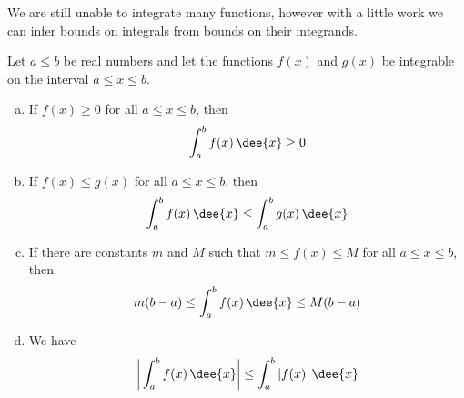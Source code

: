 We are still unable to integrate many functions, however with a little work we
can infer bounds on integrals from bounds on their integrands.
\begin{theorem}\label{thm:INTineq}
Let $a\le b$  be real numbers and let the functions $f(x)$ and $g(x)$
be integrable on the interval $a\le x\le b$.
\begin{enumerate}[(a)]
\item If $f(x)\ge 0$ for all $a\le x\le b$, then
\begin{align*}
\int_a^b f(x)\,\dee{x} \ge 0
\end{align*}
\item If $f(x)\le g(x)$ for all $a\le x\le b$, then
\begin{align*}
\int_a^b f(x)\,\dee{x} \le \int_a^b g(x)\,\dee{x}
\end{align*}
\item If there are constants $m$ and $M$ such that  $m\le f(x)\le M$
for all $a\le x\le b$, then
\begin{align*}
m(b-a)\le \int_a^b f(x)\,\dee{x} \le M(b-a)
\end{align*}
\item We have
\begin{align*}
\bigg|\int_a^b f(x)\,\dee{x}\bigg|\le \int_a^b |f(x)|\,\dee{x}
\end{align*}
\end{enumerate}
\end{theorem}

